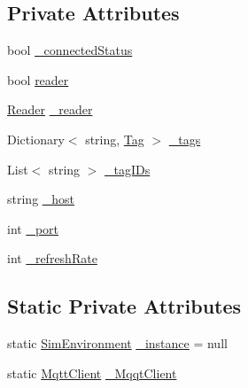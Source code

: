 \subsection*{Private Attributes}
\begin{DoxyCompactItemize}
\item 
bool \hyperlink{class_pozyx_positioner_1_1_framework_1_1_sim_environment_a3bfc7c3386466741ac20e20dca73ee33}{\+\_\+connected\+Status}
\item 
bool \hyperlink{class_pozyx_positioner_1_1_framework_1_1_sim_environment_ab1101cc55564093891da3a9ff12028f9}{reader}
\item 
\hyperlink{class_pozyx_positioner_1_1_framework_1_1_reader}{Reader} \hyperlink{class_pozyx_positioner_1_1_framework_1_1_sim_environment_a3b5b02f35a00cfb4f0237b2fa3a0ec70}{\+\_\+reader}
\item 
Dictionary$<$ string, \hyperlink{class_pozyx_positioner_1_1_framework_1_1_tag}{Tag} $>$ \hyperlink{class_pozyx_positioner_1_1_framework_1_1_sim_environment_ac4a63ffcd30b1ed0cd120e302f612c8c}{\+\_\+tags}
\item 
List$<$ string $>$ \hyperlink{class_pozyx_positioner_1_1_framework_1_1_sim_environment_a16589d3e54bc678d0c32c6dac999cb7f}{\+\_\+tag\+I\+Ds}
\item 
string \hyperlink{class_pozyx_positioner_1_1_framework_1_1_sim_environment_a01391d8f1ff2b13f275980c720c826f7}{\+\_\+host}
\item 
int \hyperlink{class_pozyx_positioner_1_1_framework_1_1_sim_environment_a27b83c707ec5c7940ca2b720f3b279ad}{\+\_\+port}
\item 
int \hyperlink{class_pozyx_positioner_1_1_framework_1_1_sim_environment_a5accfd1ee1c13ae0a68057eb17ce27e6}{\+\_\+refresh\+Rate}
\end{DoxyCompactItemize}
\subsection*{Static Private Attributes}
\begin{DoxyCompactItemize}
\item 
static \hyperlink{class_pozyx_positioner_1_1_framework_1_1_sim_environment}{Sim\+Environment} \hyperlink{class_pozyx_positioner_1_1_framework_1_1_sim_environment_af350a1664eeb1a28757466471b9e8d38}{\+\_\+instance} = null
\item 
static \hyperlink{class_pozyx_positioner_1_1_framework_1_1_mqtt_client}{Mqtt\+Client} \hyperlink{class_pozyx_positioner_1_1_framework_1_1_sim_environment_a60ce5b8b923d8f964e80c25caa6b60d7}{\+\_\+\+Mqqt\+Client}
\end{DoxyCompactItemize}



